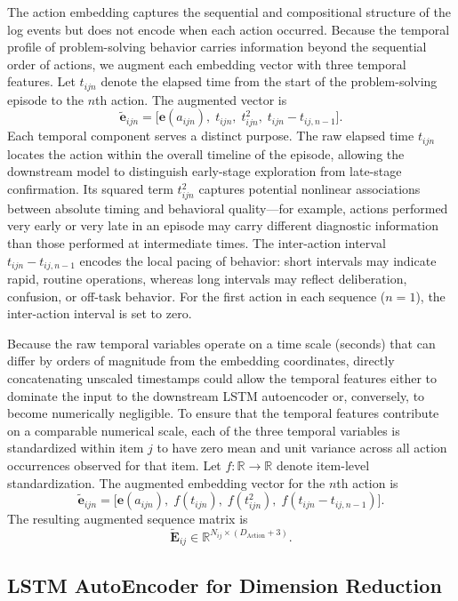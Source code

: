 \documentclass[A4paper,11pt]{article}
\begin{document}
The action embedding captures the sequential and compositional structure of the log events but does not encode when each action occurred. Because the temporal profile of problem-solving behavior carries information beyond the sequential order of actions, we augment each embedding vector with three temporal features. Let $t_{ijn}$ denote the
elapsed time from the start of the problem-solving episode to the $n$th action. The augmented vector is
\[
\tilde{\mathbf{e}}_{ijn}
=
\bigl[
\mathbf{e}(a_{ijn}),\;
t_{ijn},\;
t_{ijn}^{2},\;
t_{ijn}-t_{ij,n-1}
\bigr].
\]
Each temporal component serves a distinct purpose. The raw elapsed time $t_{ijn}$ locates the action within the overall timeline of the episode, allowing the downstream model to distinguish early-stage exploration from late-stage confirmation. Its squared term $t_{ijn}^{2}$ captures potential nonlinear associations between absolute timing and
behavioral quality---for example, actions performed very early or very late in an episode may carry different diagnostic information than those performed at intermediate times. The inter-action interval $t_{ijn}-t_{ij,n-1}$ encodes the local pacing of behavior: short intervals may indicate rapid, routine operations, whereas long intervals
may reflect deliberation, confusion, or off-task behavior. For the first action in each sequence ($n=1$), the inter-action interval is set to zero.

Because the raw temporal variables operate on a time scale (seconds) that can differ by orders of magnitude from the embedding coordinates, directly concatenating unscaled timestamps could allow the temporal features either to dominate the input to the downstream LSTM autoencoder or, conversely, to become numerically negligible. To ensure that the
temporal features contribute on a comparable numerical scale, each of the three temporal variables is standardized within item $j$ to have zero mean and unit variance across all action occurrences observed for that item. Let $f:\mathbb{R}\to\mathbb{R}$ denote item-level standardization. The augmented embedding vector for the $n$th action is
\[
\tilde{\mathbf{e}}_{ijn}
=
\bigl[
\mathbf{e}(a_{ijn}),\;
f(t_{ijn}),\;
f(t_{ijn}^{2}),\;
f(t_{ijn}-t_{ij,n-1})
\bigr].
\]
The resulting augmented sequence matrix is
\[
\tilde{\mathbf{E}}_{ij}\in\mathbb{R}^{N_{ij}\times(D_{\mathrm{Action}}+3)}.
\]

\subsection{LSTM AutoEncoder for Dimension Reduction}
\end{document}
